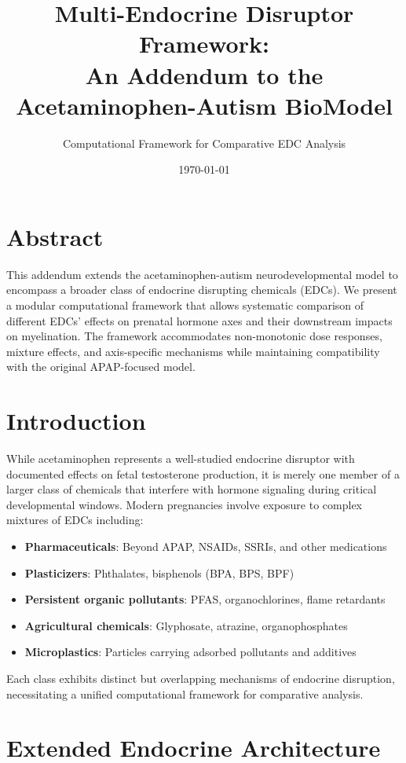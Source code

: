 \documentclass[11pt]{article}
\title{Multi-Endocrine Disruptor Framework: \\ 
An Addendum to the Acetaminophen-Autism BioModel}
\author{Computational Framework for Comparative EDC Analysis}
\date{\today}
\begin{document}
\maketitle

\section{Abstract}

This addendum extends the acetaminophen-autism neurodevelopmental model to encompass a broader class of endocrine disrupting chemicals (EDCs). We present a modular computational framework that allows systematic comparison of different EDCs' effects on prenatal hormone axes and their downstream impacts on myelination. The framework accommodates non-monotonic dose responses, mixture effects, and axis-specific mechanisms while maintaining compatibility with the original APAP-focused model.

\section{Introduction}

While acetaminophen represents a well-studied endocrine disruptor with documented effects on fetal testosterone production, it is merely one member of a larger class of chemicals that interfere with hormone signaling during critical developmental windows. Modern pregnancies involve exposure to complex mixtures of EDCs including:

\begin{itemize}
\item \textbf{Pharmaceuticals}: Beyond APAP, NSAIDs, SSRIs, and other medications
\item \textbf{Plasticizers}: Phthalates, bisphenols (BPA, BPS, BPF)
\item \textbf{Persistent organic pollutants}: PFAS, organochlorines, flame retardants
\item \textbf{Agricultural chemicals}: Glyphosate, atrazine, organophosphates
\item \textbf{Microplastics}: Particles carrying adsorbed pollutants and additives
\end{itemize}

Each class exhibits distinct but overlapping mechanisms of endocrine disruption, necessitating a unified computational framework for comparative analysis.

\section{Extended Endocrine Architecture}
\end{document}
